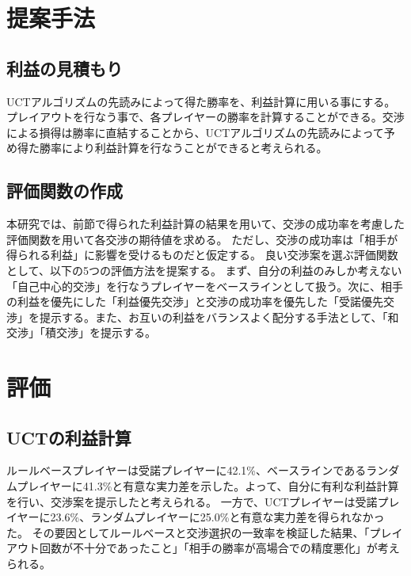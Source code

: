\documentclass[a4, 10pt,dvipdfmx,twocolumn]{jsarticle}
\begin{document}

\section{提案手法}
\subsection{利益の見積もり}
UCTアルゴリズムの先読みによって得た勝率を、利益計算に用いる事にする。プレイアウトを行なう事で、各プレイヤーの勝率を計算することができる。交渉による損得は勝率に直結することから、UCTアルゴリズムの先読みによって予め得た勝率により利益計算を行なうことができると考えられる。

\subsection{評価関数の作成}
本研究では、前節で得られた利益計算の結果を用いて、交渉の成功率を考慮した評価関数を用いて各交渉の期待値を求める。
ただし、交渉の成功率は「相手が得られる利益」に影響を受けるものだと仮定する。
良い交渉案を選ぶ評価関数として、以下の5つの評価方法を提案する。
まず、自分の利益のみしか考えない「自己中心的交渉」を行なうプレイヤーをベースラインとして扱う。次に、相手の利益を優先にした「利益優先交渉」と交渉の成功率を優先した「受諾優先交渉」を提示する。また、お互いの利益をバランスよく配分する手法として、「和交渉」「積交渉」を提示する。


\section{評価}
\subsection{UCTの利益計算}
ルールベースプレイヤーは受諾プレイヤーに42.1\%、ベースラインであるランダムプレイヤーに41.3\%と有意な実力差を示した。よって、自分に有利な利益計算を行い、交渉案を提示したと考えられる。
一方で、UCTプレイヤーは受諾プレイヤーに23.6\%、ランダムプレイヤーに25.0\%と有意な実力差を得られなかった。
その要因としてルールベースと交渉選択の一致率を検証した結果、「プレイアウト回数が不十分であったこと」「相手の勝率が高場合での精度悪化」が考えられる。
\end{document}
